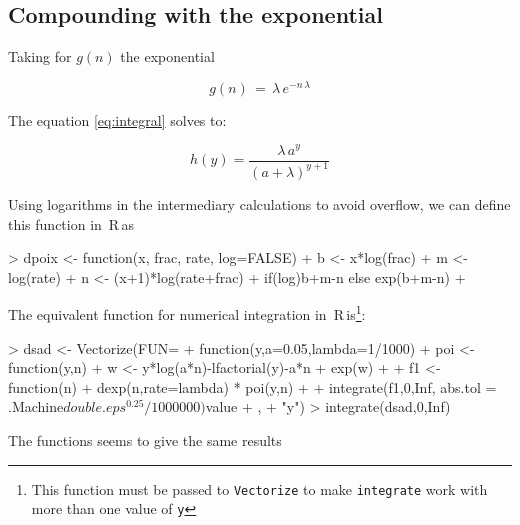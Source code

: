 \documentclass{article}
\newcommand{\R}{{\sf \,R\,}}
\newcommand{\code}[1]{\texttt{#1}}
\begin{document}
\subsection*{Compounding with the exponential}

Taking for $g(n)$ the exponential

\begin{equation}
  \label{equation}
  g(n)\, = \, \lambda\,{e}^{-n\,\lambda}
\end{equation}

The equation \ref{eq:integral} solves to:


\begin{equation}
  \label{eq:poiexp}
  h(y) = \frac{\lambda \, a^y}{(a+\lambda)^{y+1}}
\end{equation}

Using logarithms in the intermediary calculations to avoid overflow, we can define this function in \R as

\begin{Schunk}
\begin{Sinput}
> dpoix <- function(x, frac, rate, log=FALSE) {
+ 	  b <- x*log(frac)
+ 	  m <- log(rate)
+ 	  n <- (x+1)*log(rate+frac)
+           if(log)b+m-n else exp(b+m-n)
+         }
\end{Sinput}
\end{Schunk}


The equivalent function for numerical integration in \R is\footnote{This function must be passed to \code{Vectorize} to make \code{integrate} work with more than one  value of \code{y}}:


\begin{Schunk}
\begin{Sinput}
> dsad <- Vectorize(FUN=
+                   function(y,a=0.05,lambda=1/1000){
+                     poi <- function(y,n){
+                       w <- y*log(a*n)-lfactorial(y)-a*n
+                       exp(w)
+                     }
+                     f1 <- function(n){
+                       dexp(n,rate=lambda) * poi(y,n)
+                     }
+                     integrate(f1,0,Inf, abs.tol = .Machine$double.eps^0.25/1000000)$value
+                   },
+                   "y")
> integrate(dsad,0,Inf)
\end{Sinput}
\end{Schunk}

The functions seems to give the same results
\end{document}
